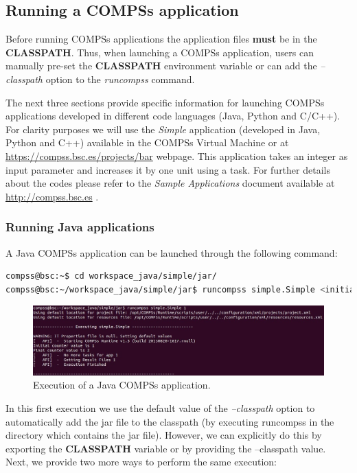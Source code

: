 \subsection{Running a COMPSs application}
\label{subsec:running_compss}
Before running COMPSs applications the application files \textbf{must} be in the \textbf{CLASSPATH}.
Thus, when launching a COMPSs application, users can manually pre-set the \textbf{CLASSPATH} environment variable
or can add the \textit{--classpath} option to the \textit{runcompss} command.

The next three sections provide specific information for launching COMPSs applications developed in different code languages (Java, Python and 
C/C++). For clarity purposes we will use the \textit{Simple} application (developed in Java, Python and C++) available in the COMPSs
Virtual Machine or at \url{https://compss.bsc.es/projects/bar} webpage. This application takes an integer as input
parameter and increases it by one unit using a task. For further details about the codes please refer to the \textit{Sample 
Applications} document available at \url{http://compss.bsc.es} .

\subsubsection{Running Java applications}
A Java COMPSs application can be launched through the following command:
\begin{lstlisting}[language=bash]
compss@bsc:~$ cd workspace_java/simple/jar/
compss@bsc:~/workspace_java/simple/jar$ runcompss simple.Simple <initial_number>
\end{lstlisting}

\begin{figure}[h!]
  \centering
    \includegraphics[width=\textwidth]{./Sections/2_Execution/Figures/java_execution.jpeg}
    \caption{Execution of a Java COMPSs application.}
    \label{fig:java_execution}
\end{figure}
\vspace{-0.4cm}

In this first execution we use the default value of the \textit{--classpath} option to automatically add the jar
file to the classpath (by executing runcompss in the directory which contains the jar file). However,
we can explicitly do this by exporting the \textbf{CLASSPATH} variable or by providing the 
--classpath value. Next, we provide two more ways to perform the same execution:

